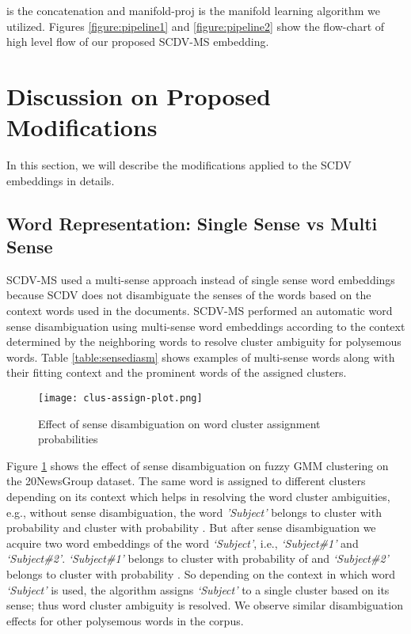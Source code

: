 \documentclass{ecai}
\newcommand{\method}{SCDV-MS}
\begin{document}
 is the concatenation and manifold-proj is the manifold learning algorithm we utilized. Figures \ref{figure:pipeline1} and \ref{figure:pipeline2} show the flow-chart of high level flow of our proposed \method{} embedding.



\section{Discussion on Proposed Modifications}
\label{sec:proposemodification} 

In this section, we will describe the modifications applied to the SCDV embeddings in details.
\subsection{Word Representation: Single Sense vs Multi Sense}
\label{subsec:multisense}

\method{} used a multi-sense approach instead of single sense word embeddings because SCDV does not disambiguate the senses of the words based on the context words used in the documents. \method{} performed an automatic word sense disambiguation using multi-sense word embeddings according to the context determined by the neighboring words to resolve cluster ambiguity for polysemous words. Table \ref{table:sensediasm} shows examples of multi-sense words along with their fitting context and the prominent words of the assigned clusters. 

\begin{figure}[!htbp]
\centering
\texttt{[image: clus-assign-plot.png]}
\vspace{-0.5em}
\caption{Effect of sense disambiguation on word cluster assignment probabilities}
\label{figure:sence-disamiguation}
\vspace{-1.5em}
\end{figure}

Figure \ref{figure:sence-disamiguation} shows the effect of sense disambiguation on fuzzy GMM clustering on the 20NewsGroup dataset. The same word is assigned to different clusters depending on its context which helps in resolving the word cluster ambiguities, e.g., without sense disambiguation, the word \textit{'Subject'} belongs to cluster  with probability  and cluster  with probability . But after sense disambiguation we acquire two word embeddings of the word \textit{`Subject'}, i.e., \textit{`Subject\#1'} and \textit{`Subject\#2'}. \textit{`Subject\#1'} belongs to cluster  with probability of  and \textit{`Subject\#2'} belongs to cluster  with probability . So depending on the context in which word \textit{`Subject'} is used, the algorithm assigns \textit{`Subject'} to a single cluster based on its sense; thus word cluster ambiguity is resolved. We observe similar disambiguation effects for other polysemous words in the corpus.
\end{document}
